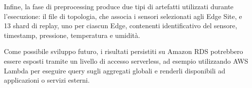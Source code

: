 Infine, la fase di preprocessing produce due tipi di artefatti utilizzati
durante l'esecuzione: il file di topologia, che associa i sensori selezionati
agli Edge Site, e 13 shard di replay, uno per ciascun Edge, contenenti
identificativo del sensore, timestamp, pressione, temperatura e umidità.

Come possibile sviluppo futuro, i risultati persistiti su Amazon RDS
potrebbero essere esposti tramite un livello di accesso serverless, ad esempio
utilizzando AWS Lambda per eseguire query sugli aggregati globali e renderli
disponibili ad applicazioni o servizi esterni.